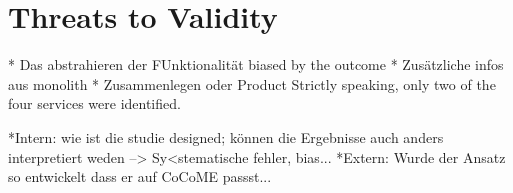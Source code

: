 \section{Threats to Validity}
\label{sec:Evalutation:ThreatsToValidity}
* Das abstrahieren der FUnktionalität biased by the outcome
* Zusätzliche infos aus monolith
* Zusammenlegen oder Product Strictly speaking, only two of the four services were identified. 

*Intern: wie ist die studie designed; können die Ergebnisse auch anders interpretiert weden --> Sy<stematische fehler, bias...
*Extern: Wurde der Ansatz so entwickelt dass er auf CoCoME passst...


